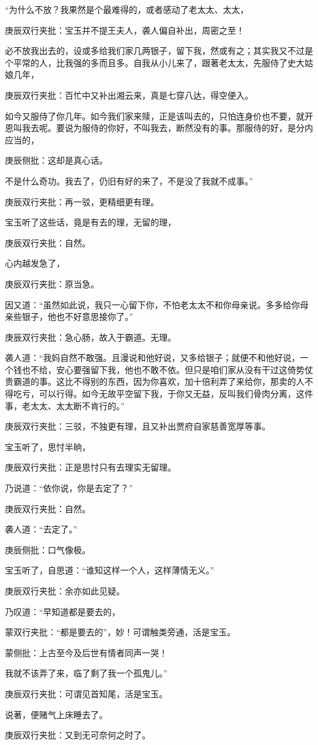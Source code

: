 \begin{parag}
“为什么不放？我果然是个最难得的，或者感动了老太太、太太，\begin{note}庚辰双行夹批：宝玉并不提王夫人，袭人偏自补出，周密之至！\end{note}必不放我出去的，设或多给我们家几两银子，留下我，然或有之；其实我又不过是个平常的人，比我强的多而且多。自我从小儿来了，跟著老太太，先服侍了史大姑娘几年，\begin{note}庚辰双行夹批：百忙中又补出湘云来，真是七穿八达，得空便入。\end{note}如今又服侍了你几年。如今我们家来赎，正是该叫去的，只怕连身价也不要，就开恩叫我去呢。要说为服侍的你好，不叫我去，断然没有的事。那服侍的好，是分内应当的，\begin{note}庚辰侧批：这却是真心话。\end{note}不是什么奇功。我去了，仍旧有好的来了，不是没了我就不成事。”\begin{note}庚辰双行夹批：再一驳，更精细更有理。\end{note}宝玉听了这些话，竟是有去的理，无留的理，\begin{note}庚辰双行夹批：自然。\end{note}心内越发急了，\begin{note}庚辰双行夹批：原当急。\end{note}因又道：“虽然如此说，我只一心留下你，不怕老太太不和你母亲说。多多给你母亲些银子，他也不好意思接你了。”\begin{note}庚辰双行夹批：急心肠，故入于霸道。无理。\end{note}袭人道：“我妈自然不敢强。且漫说和他好说，又多给银子；就便不和他好说，一个钱也不给，安心要强留下我，他也不敢不依。但只是咱们家从没有干过这倚势仗贵霸道的事。这比不得别的东西，因为你喜欢，加十倍利弄了来给你，那卖的人不得吃亏，可以行得。如今无故平空留下我，于你又无益，反叫我们骨肉分离，这件事，老太太、太太断不肯行的。”\begin{note}庚辰双行夹批：三驳，不独更有理，且又补出贾府自家慈善宽厚等事。\end{note}宝玉听了，思忖半晌，\begin{note}庚辰双行夹批：正是思忖只有去理实无留理。\end{note}乃说道：“依你说，你是去定了？”\begin{note}庚辰双行夹批：自然。\end{note}袭人道：“去定了。”\begin{note}庚辰侧批：口气像极。\end{note}宝玉听了，自思道：“谁知这样一个人，这样薄情无义。”\begin{note}庚辰双行夹批：余亦如此见疑。\end{note}乃叹道：“早知道都是要去的，\begin{note}蒙双行夹批：“都是要去的”，妙！可谓触类旁通，活是宝玉。\end{note}\begin{note}蒙侧批：上古至今及后世有情者同声一哭！\end{note}我就不该弄了来，临了剩了我一个孤鬼儿。”\begin{note}庚辰双行夹批：可谓见首知尾，活是宝玉。\end{note}说著，便赌气上床睡去了。\begin{note}庚辰双行夹批：又到无可奈何之时了。\end{note}

\end{parag}
